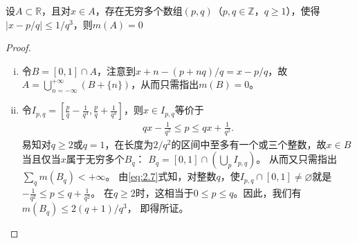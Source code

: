 \documentclass[../../main.tex]{subfiles}
\begin{document}
\begin{example}
设\(A\subset\mathbb{R}\)，且对\(x\in A\)，存在无穷多个数组\((p,q)\)（\(p,q\in\mathbb{Z}\)，\(q\geqslant1\)），使得\(\vert x - p/q\vert\leqslant1/q^3\)，则\(m(A)=0\)
\end{example}
\begin{proof}
\begin{enumerate}[(i)]
\item 令\(B = [0,1]\cap A\)，注意到\(x + n-(p + nq)/q=x - p/q\)，故\(A=\bigcup_{n = -\infty}^{+\infty}(B+\{n\})\)，从而只需指出\(m(B)=0\)。
\item 令\(I_{p,q}=\left[\frac{p}{q}-\frac{1}{q^3},\frac{p}{q}+\frac{1}{q^3}\right]\)，则\(x\in I_{p,q}\)等价于
\begin{align}
qx-\frac{1}{q^2}\leqslant p\leqslant qx+\frac{1}{q^2}.\label{eq:2.7}
\end{align}
易知对\(q\geqslant2\)或\(q = 1\)，在长度为\(2/q^2\)的区间中至多有一个或三个整数，故\(x\in B\)当且仅当\(x\)属于无穷多个\(B_q\)：
\(B_q = [0,1]\cap\left(\bigcup_{p}I_{p,q}\right)\)。
从而又只需指出\(\sum_{q}m(B_q)<+\infty\)。
由\eqref{eq:2.7}式知，对整数\(q\)，使\(I_{p,q}\cap[0,1]\neq\varnothing\)就是
\(-\frac{1}{q^2}\leqslant p\leqslant q+\frac{1}{q^2}\)。
在\(q\geqslant2\)时，这相当于\(0\leqslant p\leqslant q\)。因此，我们有
\(m(B_q)\leqslant 2(q + 1)/q^3\)，
即得所证。
\end{enumerate} 
\end{proof}
\end{document}
